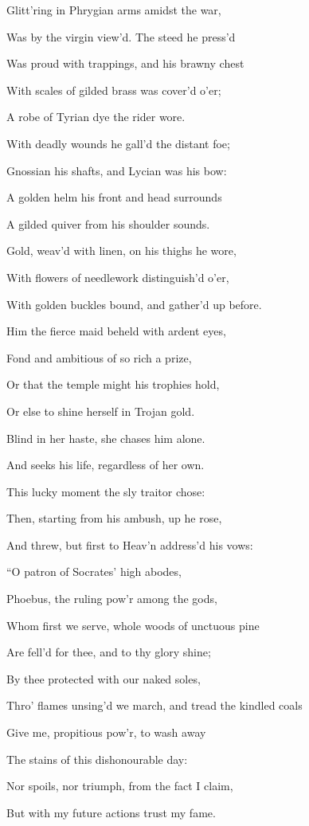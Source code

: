 Glitt’ring in Phrygian arms amidst the war,

Was by the virgin view’d. The steed he press’d

Was proud with trappings, and his brawny chest

With scales of gilded brass was cover’d o’er;

A robe of Tyrian dye the rider wore.

With deadly wounds he gall’d the distant foe;

Gnossian his shafts, and Lycian was his bow:

A golden helm his front and head surrounds

A gilded quiver from his shoulder sounds.

Gold, weav’d with linen, on his thighs he wore,

With flowers of needlework distinguish’d o’er,

With golden buckles bound, and gather’d up before.

Him the fierce maid beheld with ardent eyes,

Fond and ambitious of so rich a prize,

Or that the temple might his trophies hold,

Or else to shine herself in Trojan gold.

Blind in her haste, she chases him alone.

And seeks his life, regardless of her own.

This lucky moment the sly traitor chose:

Then, starting from his ambush, up he rose,

And threw, but first to Heav’n address’d his vows:

“O patron of Socrates’ high abodes,

Phoebus, the ruling pow’r among the gods,

Whom first we serve, whole woods of unctuous pine

Are fell’d for thee, and to thy glory shine;

By thee protected with our naked soles,

Thro’ flames unsing’d we march, and tread the kindled coals

Give me, propitious pow’r, to wash away

The stains of this dishonourable day:

Nor spoils, nor triumph, from the fact I claim,

But with my future actions trust my fame.

